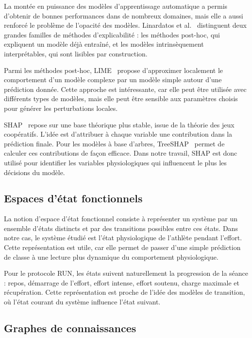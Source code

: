 \documentclass[12pt,a4paper]{article}
\begin{document}
La montée en puissance des modèles d'apprentissage automatique a permis
d'obtenir de bonnes performances dans de nombreux domaines, mais elle a aussi
renforcé le problème de l'opacité des modèles. Linardatos et al.~\cite{linardatos2020}
distinguent deux grandes familles de méthodes d'explicabilité : les méthodes
post-hoc, qui expliquent un modèle déjà entraîné, et les modèles
intrinsèquement interprétables, qui sont lisibles par construction.

Parmi les méthodes post-hoc, LIME~\cite{ribeiro2016} propose d'approximer
localement le comportement d'un modèle complexe par un modèle simple autour
d'une prédiction donnée. Cette approche est intéressante, car elle peut être
utilisée avec différents types de modèles, mais elle peut être sensible aux
paramètres choisis pour générer les perturbations locales.

SHAP~\cite{lundberg2017} repose sur une base théorique plus stable, issue de
la théorie des jeux coopératifs. L'idée est d'attribuer à chaque variable une
contribution dans la prédiction finale. Pour les modèles à base d'arbres,
TreeSHAP~\cite{lundberg2020} permet de calculer ces contributions de façon
efficace. Dans notre travail, SHAP est donc utilisé pour identifier les
variables physiologiques qui influencent le plus les décisions du modèle.

\subsection{Espaces d'état fonctionnels}

La notion d'espace d'état fonctionnel consiste à représenter un système par
un ensemble d'états distincts et par des transitions possibles entre ces
états. Dans notre cas, le système étudié est l'état physiologique de
l'athlète pendant l'effort. Cette représentation est utile, car elle permet
de passer d'une simple prédiction de classe à une lecture plus dynamique du
comportement physiologique.

Pour le protocole RUN, les états suivent naturellement la progression de la
séance : repos, démarrage de l'effort, effort intense, effort soutenu, charge
maximale et récupération. Cette représentation est proche de l'idée des
modèles de transition, où l'état courant du système influence l'état suivant.

\subsection{Graphes de connaissances}
\end{document}
